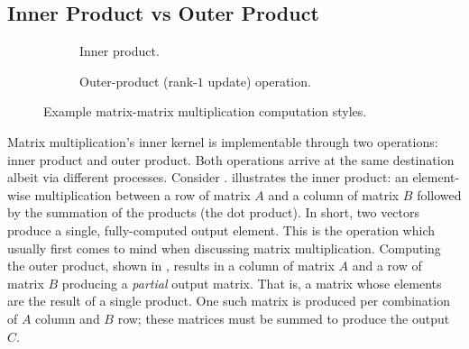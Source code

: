 \documentclass[\main/thesis.tex]{subfiles}
\begin{document}
\subsection{Inner Product vs Outer Product}
\label{sec:products}
\begin{figure}[t]
 \hfill
  \begin{subfigure}{.45\linewidth}
    \centering
    \caption{Inner product.}
    \label{fig:innerProduct}
  \end{subfigure}
 \hfill
  \begin{subfigure}{.45\linewidth}
    \centering
  \caption{Outer-product (rank-$1$ update) operation.}
    \label{fig:outerProduct}
  \end{subfigure}
  \hfill
  \caption{Example matrix-matrix multiplication computation styles.}
  \label{fig:product}
  \vspace{-0.15cm}
\end{figure}

Matrix multiplication's inner kernel is implementable through two operations: inner product and outer product.
Both operations arrive at the same destination albeit via different processes.
Consider .
 illustrates the inner product: an element-wise multiplication between a row of matrix $A$ and a column of matrix $B$ followed by the summation of the products (\ie the dot product).
In short, two vectors produce a single, fully-computed output element.
This is the operation which usually first comes to mind when discussing matrix multiplication.
Computing the outer product, shown in , results in a column of matrix $A$ and a row of matrix $B$ producing a \emph{partial} output matrix.
That is, a matrix whose elements are the result of a single product.
One such matrix is produced per combination of $A$ column and $B$ row; these matrices must be summed to produce the output $C$.
\end{document}
